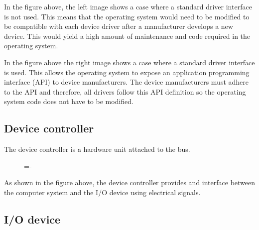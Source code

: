 \documentclass[a4paper]{systems-software}
\begin{document}
In the figure above, the left image shows a case where a standard driver interface is not used. This means that the operating system would need to be modified to be compatible with each device driver after a manufacturer develops a new device. This would yield a high amount of maintenance and code required in the operating system.

In the figure above the right image shows a case where a standard driver interface is used. This allows the operating system to expose an application programming interface (API) to device manufacturers. The device manufacturers must adhere to the API and therefore, all drivers follow this API definition so the operating system code does not have to be modified.


\subsection*{Device controller}

The device controller is a hardware unit attached to the bus.

\begin{figure}[H]
  \lineskip=-\fboxrule
\end{figure}

As shown in the figure above, the device controller provides and interface between the computer system and the I/O device using electrical signals.


\subsection*{I/O device}
\end{document}
